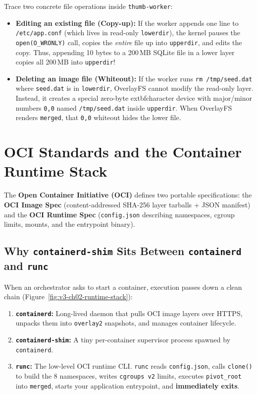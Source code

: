 Trace two concrete file operations inside \texttt{thumb-worker}:
\begin{itemize}[leftmargin=12pt]
  \item \textbf{Editing an existing file (Copy-up):} If the worker appends one line to \texttt{/etc/app.conf} (which lives in read-only \texttt{lowerdir}), the kernel pauses the \texttt{open(O\_WRONLY)} call, copies the \emph{entire} file up into \texttt{upperdir}, and edits the copy. Thus, appending 10 bytes to a 200\,MB SQLite file in a lower layer copies all 200\,MB into \texttt{upperdir}!
  \item \textbf{Deleting an image file (Whiteout):} If the worker runs \texttt{rm /tmp/seed.dat} where \texttt{seed.dat} is in \texttt{lowerdir}, OverlayFS cannot modify the read-only layer. Instead, it creates a special zero-byte 	extbf{character device with major/minor numbers \texttt{0,0}} named \texttt{/tmp/seed.dat} inside \texttt{upperdir}. When OverlayFS renders \texttt{merged}, that \texttt{0,0} whiteout hides the lower file.
\end{itemize}

\section{OCI Standards and the Container Runtime Stack}

The \textbf{Open Container Initiative (OCI)} defines two portable specifications: the \textbf{OCI Image Spec} (content-addressed SHA-256 layer tarballs + JSON manifest) and the \textbf{OCI Runtime Spec} (\texttt{config.json} describing namespaces, cgroup limits, mounts, and the entrypoint binary).

\subsection{Why \texttt{containerd-shim} Sits Between \texttt{containerd} and \texttt{runc}}
When an orchestrator asks to start a container, execution passes down a clean chain (Figure~\ref{fig:v3-ch02-runtime-stack}):
\begin{enumerate}[leftmargin=15pt]
  \item \textbf{\texttt{containerd}:} Long-lived daemon that pulls OCI image layers over HTTPS, unpacks them into \texttt{overlay2} snapshots, and manages container lifecycle.
  \item \textbf{\texttt{containerd-shim}:} A tiny per-container supervisor process spawned by \texttt{containerd}.
  \item \textbf{\texttt{runc}:} The low-level OCI runtime CLI. \texttt{runc} reads \texttt{config.json}, calls \texttt{clone()} to build the 8 namespaces, writes \texttt{cgroups v2} limits, executes \texttt{pivot\_root} into \texttt{merged}, starts your application entrypoint, and \textbf{immediately exits}.
\end{enumerate}

